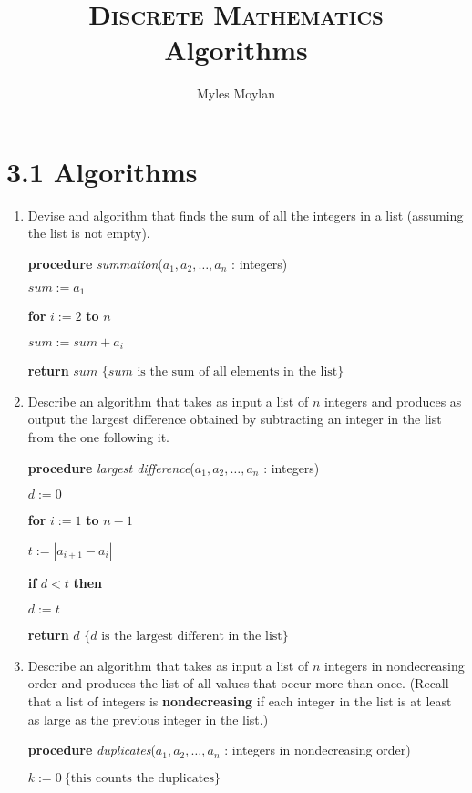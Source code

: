 \documentclass[11pt]{article}
\title{	
	\normalfont \normalsize 
	\textsc{Discrete Mathematics} \\
	\huge Algorithms \\
}
\author{Myles Moylan} %
\date{} %
\begin{document}
	
\maketitle

\section*{\textbf{3.1 Algorithms}}
\begin{enumerate}[label=\textbf{\arabic*.}]
	\item Devise and algorithm that finds the sum of all the integers in a list (assuming the list is not empty).
	
	\textbf{procedure} \emph{summation}($a_1, a_2, \ldots, a_n$ : integers)
	
	$sum := a_1$
	
	\textbf{for} $i := 2$ \textbf{to} $n$
	
	\qquad $sum := sum + a_i$
	
	\textbf{return} $sum$ $\{ sum \text{ is the sum of all elements in the list} \}$
	
	\item Describe an algorithm that takes as input a list of $n$ integers and produces as output the largest difference obtained by subtracting an integer in the list from the one following it.
	
	\textbf{procedure} \emph{largest difference}($a_1, a_2, \ldots, a_n$ : integers)
	
	$d := 0$
	
	\textbf{for} $i := 1$ \textbf{to} $n - 1$
	
	\qquad $t := |a_{i + 1} - a_i|$
	
	\qquad \textbf{if} $d < t$ \textbf{then}
	
	\qquad\qquad $d := t$
	
	\textbf{return} $d$ $\{ d \text{ is the largest different in the list} \}$
	
	\item Describe an algorithm that takes as input a list of $n$ integers in nondecreasing order and produces the list of all values that occur more than once. (Recall that a list of integers is \textbf{nondecreasing} if each integer in the list is at least as large as the previous integer in the list.)
	
	\textbf{procedure} \emph{duplicates}($a_1, a_2, \ldots, a_n$ : integers in nondecreasing order)
	
	$k := 0\ \{ \text{this counts the duplicates} \}$
	

\end{enumerate}
\end{document}
